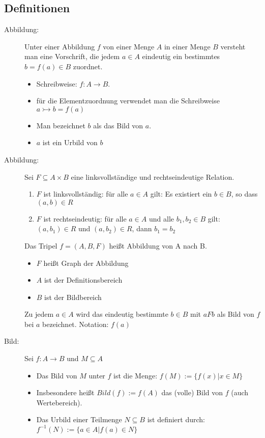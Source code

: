 \subsection*{Definitionen}
\begin{description}
  \item [Abbildung:] 
    Unter einer Abbildung $f$ von einer Menge $A$ in einer Menge $B$ versteht 
    man eine Vorschrift, die jedem $a \in A$ eindeutig ein bestimmtes 
    $b = f(a) \in B$ zuordnet.
    \begin{itemize}
      \setlength\itemsep{-0.05cm}
      \item Schreibweise: $f : A \rightarrow B$.
      \item für die Elementzuordnung verwendet man die Schreibweise 
            $a \rightarrowtail b = f(a)$
      \item Man bezeichnet $b$ als das Bild von $a$.
      \item $a$ ist ein Urbild von $b$
    \end{itemize}

  \item [Abbildung:] 
    Sei $F \subseteq A \times B$ eine linksvollständige und rechtseindeutige 
    Relation.
    \begin{enumerate}
      \item $F$ ist linksvollständig: für alle $a \in A$ gilt: Es existiert ein 
            $b \in B$, so dass $(a,b) \in R$
      \item $F$ ist rechtseindeutig: für alle $a \in A$ und alle 
            $b_1, b_2 \in B$ gilt: $(a,b_1) \in R$ und $(a,b_2) \in R$, dann 
            $b_1 = b_2$
    \end{enumerate}
    Das Tripel $f = (A,B,F)$ heißt Abbildung von A nach B.
    \begin{itemize}
      \item $F$ heißt Graph der Abbildung
      \item $A$ ist der Definitionsbereich
      \item $B$ ist der Bildbereich
    \end{itemize}
    Zu jedem $a \in A$ wird das eindeutig bestimmte $b \in B$ mit $aFb$ als Bild
    von $f$ bei $a$ bezeichnet. Notation: $f(a)$

  \item [Bild:]
    Sei $f : A \rightarrow B$ und $M \subseteq A$
    \begin{itemize}
      \item Das Bild von $M$ unter $f$ ist die Menge:
            $f(M) := \{f(x) | x \in M\}$
      \item Insbesondere heißt $Bild(f) := f(A)$ das (volle) Bild von $f$
            (auch Wertebereich).
      \item Das Urbild einer Teilmenge $N \subseteq B$ ist definiert durch: 
            $f^{-1}(N) := \{a\in A | f(a) \in N\}$
    \end{itemize}


\end{description}
